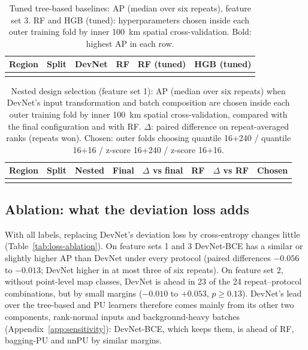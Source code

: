 \documentclass[pdflatex,sn-apa]{sn-jnl}
\begin{document}
\begin{table}[t]
\caption{Tuned tree-based baselines: AP (median over six repeats), feature set 3. RF and HGB (tuned): hyperparameters chosen inside each outer training fold by inner 100~km spatial cross-validation. Bold: highest AP in each row.}\label{tab:controls}
\footnotesize
\setlength{\tabcolsep}{3pt}
\begin{tabular*}{\textwidth}{@{\extracolsep\fill}llcccc}
\toprule
Region & Split & DevNet & RF & RF (tuned) & HGB (tuned) \\
\midrule
\botrule
\end{tabular*}
\end{table}

\begin{table}[t]
\caption{Nested design selection (feature set 1): AP (median over six repeats) when DevNet's input transformation and batch composition are chosen inside each outer training fold by inner 100~km spatial cross-validation, compared with the final configuration and with RF. $\Delta$: paired difference on repeat-averaged ranks (repeats won). Chosen: outer folds choosing quantile 16+240 / quantile 16+16 / z-score 16+240 / z-score 16+16.}\label{tab:nested}
\scriptsize
\setlength{\tabcolsep}{2.5pt}
\begin{tabular*}{\textwidth}{@{\extracolsep\fill}llcccccc}
\toprule
Region & Split & Nested & Final & $\Delta$ vs final & RF & $\Delta$ vs RF & Chosen \\
\midrule
\botrule
\end{tabular*}
\end{table}

\subsection{Ablation: what the deviation loss adds}\label{sec:res-ablation}

With all labels, replacing DevNet's deviation loss by cross-entropy changes little (Table~\ref{tab:loss-ablation}). On feature sets 1 and 3 DevNet-BCE has a similar or slightly higher AP than DevNet under every protocol (paired differences $-0.056$ to $-0.013$; DevNet higher in at most three of six repeats). On feature set 2, without point-level map classes, DevNet is ahead in 23 of the 24 repeat--protocol combinations, but by small margins ($-0.010$ to $+0.053$, $p \geq 0.13$). DevNet's lead over the tree-based and PU learners therefore comes mainly from its other two components, rank-normal inputs and background-heavy batches (Appendix~\ref{app:sensitivity}): DevNet-BCE, which keeps them, is ahead of RF, bagging-PU and nnPU by similar margins.
\end{document}
